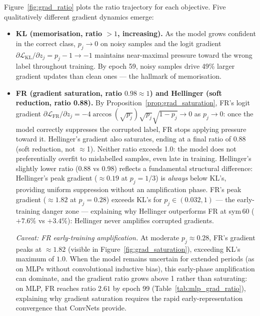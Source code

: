 \documentclass[11pt]{article}
\begin{document}
Figure~\ref{fig:grad_ratio} plots the ratio trajectory for each objective.
Five qualitatively different gradient dynamics emerge:
\begin{itemize}
  \item \textbf{KL (memorisation, ratio $> 1$, increasing).}
    As the model grows confident in the correct class, $p_j \to 0$ on noisy samples
    and the logit gradient $\partial \mathcal{L}_\mathrm{KL}/\partial z_j = p_j - 1
    \to -1$ maintains near-maximal pressure toward the wrong label throughout training.
    By epoch 59, noisy samples drive 49\% larger gradient updates than clean ones —
    the hallmark of memorisation.

  \item \textbf{FR (gradient saturation, ratio $0.98\approx 1$) and Hellinger (soft reduction, ratio 0.88).}
    By Proposition~\ref{prop:grad_saturation}, FR's logit gradient
    $\partial \mathcal{L}_\mathrm{FR}/\partial z_j =
    -4\arccos(\sqrt{p_j})\sqrt{p_j}\sqrt{1-p_j} \to 0$ as $p_j \to 0$:
    once the model correctly suppresses the corrupted label, FR stops applying
    pressure toward it.
    Hellinger's gradient also saturates, ending at a final ratio of 0.88 (soft reduction, not $\approx$1).
    Neither ratio exceeds 1.0: the model does not preferentially overfit to
    mislabelled samples, even late in training.
    Hellinger's slightly lower ratio (0.88 vs 0.98) reflects a fundamental structural
    difference: Hellinger's peak gradient ($\approx 0.19$ at $p_j=1/3$) is \emph{always}
    below KL's, providing uniform suppression without an amplification phase.
    FR's peak gradient ($\approx 1.82$ at $p_j=0.28$) exceeds KL's for $p_j \in (0.032,1)$ —
    the early-training danger zone — explaining why Hellinger outperforms FR at sym\,60
    ($+7.6\%$ vs $+3.4\%$): Hellinger never amplifies corrupted gradients.

    \textit{Caveat: FR early-training amplification.}
    At moderate $p_j \approx 0.28$, FR's gradient peaks at $\approx 1.82$ (visible in
    Figure~\ref{fig:grad_saturation}), exceeding KL's maximum of $1.0$.
    When the model remains uncertain for extended periods (as on MLPs without
    convolutional inductive bias), this early-phase amplification can dominate, and the
    gradient ratio grows above 1 rather than saturating: on MLP, FR reaches ratio $2.61$
    by epoch 99 (Table~\ref{tab:mlp_grad_ratio}), explaining why gradient saturation
    requires the rapid early-representation convergence that ConvNets provide.


\end{itemize}
\end{document}
